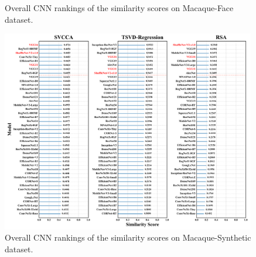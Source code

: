 \documentclass[letterpaper]{article} %
\begin{document}
\begin{figure}[t]
	\centering
	\caption{Overall CNN rankings of the similarity scores on Macaque-Face dataset.}
	\label{Fig.cnn_model_rank_macaque_face}
\end{figure}

\begin{figure}[t]
	\centering
	\includegraphics[width=0.99\textwidth]{figs/cnn_model_rank_macaque_synthetic.pdf}
	\caption{Overall CNN rankings of the similarity scores on Macaque-Synthetic dataset.}
	\label{Fig.cnn_model_rank_macaque_synthetic}
\end{figure}
\end{document}
